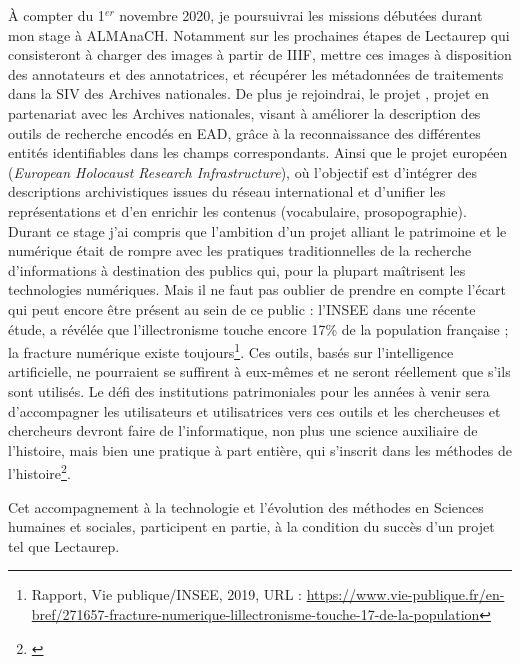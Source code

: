 À compter du 1$^{er}$ novembre 2020, je poursuivrai les missions débutées durant mon stage à ALMAnaCH. Notamment sur les prochaines étapes de Lectaurep qui consisteront à charger des images à partir de IIIF, mettre ces images à disposition des annotateurs et des annotatrices, et récupérer les métadonnées de traitements dans la SIV des Archives nationales. De plus je rejoindrai, le projet , projet en partenariat avec les Archives nationales, visant à améliorer la description des outils de recherche encodés en EAD, grâce à la reconnaissance des différentes entités identifiables dans les champs correspondants. Ainsi que le projet européen  (\textit{European Holocaust Research Infrastructure}), où l'objectif est d'intégrer des descriptions archivistiques issues du réseau international et d'unifier les représentations et d'en enrichir les contenus (vocabulaire, prosopographie).\\

Durant ce stage j'ai compris que l'ambition d'un projet alliant le patrimoine et le numérique était de rompre avec les pratiques traditionnelles de la recherche d'informations à destination des publics qui, pour la plupart maîtrisent les technologies numériques. Mais il ne faut pas oublier de prendre en compte l'écart qui peut encore être présent au sein de ce public : l'INSEE dans une récente étude, a révélée que l'illectronisme touche encore 17\% de la population française ; la fracture numérique existe toujours\footnote{Rapport, Vie publique/INSEE, 2019, URL : \url{https://www.vie-publique.fr/en-bref/271657-fracture-numerique-lillectronisme-touche-17-de-la-population}}. Ces outils, basés sur l'intelligence artificielle, ne pourraient se suffirent à eux-mêmes et ne seront réellement  que s'ils sont utilisés. Le défi des institutions patrimoniales pour les années à venir sera d'accompagner les utilisateurs et utilisatrices vers ces outils et les chercheuses et chercheurs devront faire de l'informatique, non plus une science auxiliaire de l'histoire, mais bien une pratique à part entière, qui s'inscrit dans les méthodes  de l'histoire\footnote{\cite{heimburger_faire_2011}}. 

Cet accompagnement à la technologie et l'évolution des méthodes en Sciences humaines et sociales, participent en partie, à la condition du succès d'un projet tel que Lectaurep.

\newpage
\thispagestyle{empty}